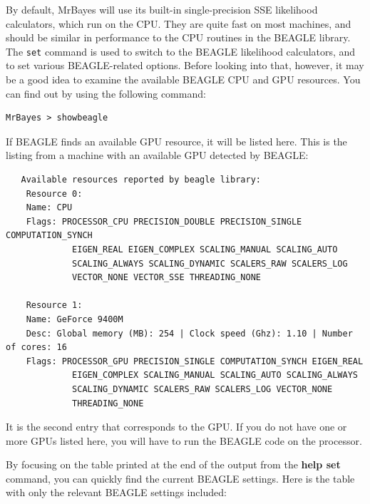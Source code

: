 \documentclass[12pt]{book}
\newcommand{\ttt}[1]{\texttt{#1} }
\begin{document}
By default, MrBayes will use its built-in single-precision SSE likelihood calculators, which run on the CPU. They
are quite fast on most machines, and should be similar in performance to the CPU routines in the BEAGLE library.
The \ttt{set} command is used to switch to the BEAGLE likelihood calculators, and to set various BEAGLE-related
options. Before looking into that, however, it may be a good idea to examine the available BEAGLE CPU and
GPU resources. You can find out by using the following command:

\begin{verbatim}
MrBayes > showbeagle
\end{verbatim}

If BEAGLE finds an available GPU resource, it will be listed here. This is the listing from a machine with
an available GPU detected by BEAGLE:

\footnotesize
\begin{singlespacing}
\begin{verbatim}
   Available resources reported by beagle library:
	Resource 0:
	Name: CPU
	Flags: PROCESSOR_CPU PRECISION_DOUBLE PRECISION_SINGLE COMPUTATION_SYNCH
             EIGEN_REAL EIGEN_COMPLEX SCALING_MANUAL SCALING_AUTO
             SCALING_ALWAYS SCALING_DYNAMIC SCALERS_RAW SCALERS_LOG
             VECTOR_NONE VECTOR_SSE THREADING_NONE

	Resource 1:
	Name: GeForce 9400M
	Desc: Global memory (MB): 254 | Clock speed (Ghz): 1.10 | Number of cores: 16
	Flags: PROCESSOR_GPU PRECISION_SINGLE COMPUTATION_SYNCH EIGEN_REAL
             EIGEN_COMPLEX SCALING_MANUAL SCALING_AUTO SCALING_ALWAYS
             SCALING_DYNAMIC SCALERS_RAW SCALERS_LOG VECTOR_NONE
             THREADING_NONE
\end{verbatim}
\end{singlespacing}
\normalsize

It is the second entry that corresponds to the GPU. If you do not have one or more GPUs listed here,
you will have to run the BEAGLE code on the processor.

By focusing on the table printed at the end of the output from the \textbf{help set} command, you can
quickly find the current BEAGLE settings. Here is the table with only the relevant BEAGLE settings
included:
\end{document}
